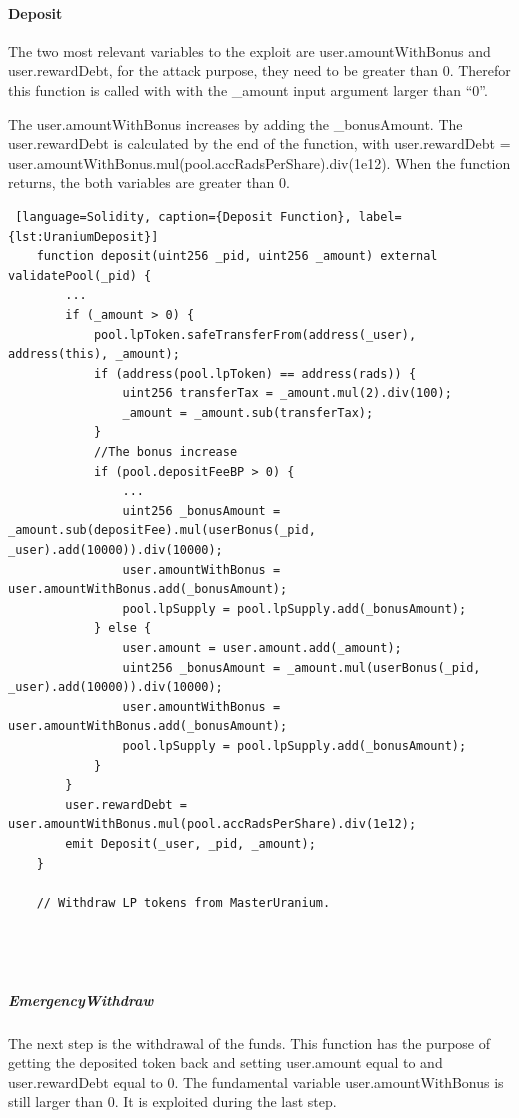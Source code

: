 \paragraph{Deposit} The two most relevant variables to the exploit are user.amountWithBonus and user.rewardDebt, for the attack purpose, they need to be greater than 0.
Therefor this function is called with  with the \_amount input argument larger than “0”. 

The user.amountWithBonus increases by adding  
the \_bonusAmount. 
The user.rewardDebt is calculated by the end of the function, with
user.rewardDebt = 
user.amountWithBonus.mul(pool.accRadsPerShare).div(1e12).
When the function returns, the  both variables are greater than 0.

\begin{lstlisting} [language=Solidity, caption={Deposit Function}, label={lst:UraniumDeposit}]
    function deposit(uint256 _pid, uint256 _amount) external validatePool(_pid) {
        ...
        if (_amount > 0) {
            pool.lpToken.safeTransferFrom(address(_user), address(this), _amount);
            if (address(pool.lpToken) == address(rads)) {
                uint256 transferTax = _amount.mul(2).div(100);
                _amount = _amount.sub(transferTax);
            }
            //The bonus increase
            if (pool.depositFeeBP > 0) {
                ...
                uint256 _bonusAmount = _amount.sub(depositFee).mul(userBonus(_pid, _user).add(10000)).div(10000);
                user.amountWithBonus = user.amountWithBonus.add(_bonusAmount);
                pool.lpSupply = pool.lpSupply.add(_bonusAmount);
            } else {
                user.amount = user.amount.add(_amount);
                uint256 _bonusAmount = _amount.mul(userBonus(_pid, _user).add(10000)).div(10000);
                user.amountWithBonus = user.amountWithBonus.add(_bonusAmount);
                pool.lpSupply = pool.lpSupply.add(_bonusAmount);
            }
        }
        user.rewardDebt = user.amountWithBonus.mul(pool.accRadsPerShare).div(1e12);
        emit Deposit(_user, _pid, _amount);
    }

    // Withdraw LP tokens from MasterUranium.




\end{lstlisting} 

\subparagraph{EmergencyWithdraw} 
The next step is the withdrawal of the funds. 
This function has the purpose of getting the deposited token back and setting user.amount equal to and user.rewardDebt equal to 0.
The fundamental variable user.amountWithBonus is still larger than 0. It is exploited during the last step.

